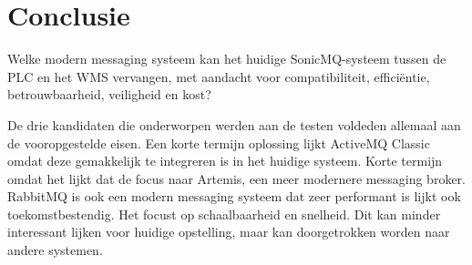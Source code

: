 
\chapter{Conclusie}%
\label{ch:conclusie}


Welke modern messaging systeem kan het huidige SonicMQ-systeem tussen de PLC en het WMS vervangen, 
met aandacht voor compatibiliteit, efficiëntie, betrouwbaarheid, veiligheid en kost?


De drie kandidaten die onderworpen werden aan de testen voldeden allemaal aan de vooropgestelde eisen.
Een korte termijn oplossing lijkt ActiveMQ Classic omdat deze gemakkelijk te integreren is in het huidige systeem.
Korte termijn omdat het lijkt dat de focus naar Artemis, een meer modernere messaging broker.
RabbitMQ is ook een modern messaging systeem dat zeer performant is lijkt ook toekomstbestendig.
Het focust op schaalbaarheid en snelheid. Dit kan minder interessant lijken voor huidige opstelling, maar kan doorgetrokken worden naar
andere systemen.


